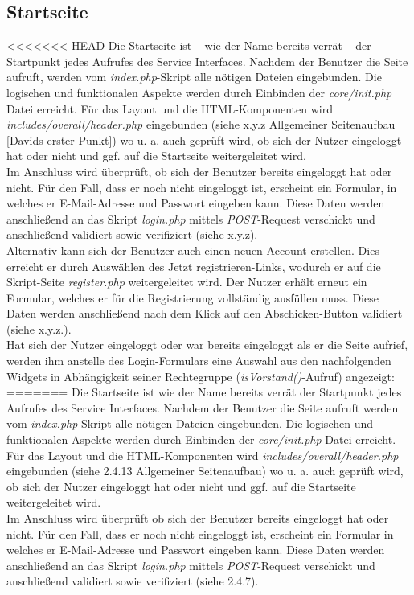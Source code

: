 \documentclass[fontsize = 12pt, paper = a4]{scrreprt}
\begin{document}
\subsection{Startseite}
<<<<<<< HEAD
Die Startseite ist -- wie der Name bereits verrät -- der Startpunkt jedes Aufrufes des Service Interfaces. Nachdem der Benutzer die Seite aufruft, werden vom \textit{index.php}-Skript alle nötigen Dateien eingebunden. Die logischen und funktionalen Aspekte werden durch Einbinden der \textit{core/init.php} Datei erreicht. Für das Layout und die HTML-Komponenten wird \textit{includes/overall/header.php} eingebunden (siehe x.y.z Allgemeiner Seitenaufbau [Davids erster Punkt]) wo u. a. auch geprüft wird, ob sich der Nutzer eingeloggt hat oder nicht und ggf. auf die Startseite weitergeleitet wird.\\
Im Anschluss wird überprüft, ob sich der Benutzer bereits eingeloggt hat oder nicht. Für den Fall, dass er noch nicht eingeloggt ist, erscheint ein Formular, in welches er E-Mail-Adresse und Passwort eingeben kann. Diese Daten werden anschließend an das Skript \textit{login.php} mittels \textit{POST}-Request verschickt und anschließend validiert sowie verifiziert (siehe x.y.z).\\
Alternativ kann sich der Benutzer auch einen neuen Account erstellen. Dies erreicht er durch Auswählen des \glqq Jetzt registrieren\grqq-Links, wodurch er auf die Skript-Seite \textit{register.php} weitergeleitet wird. Der Nutzer erhält erneut ein Formular, welches er für die Registrierung vollständig ausfüllen muss. Diese Daten werden anschließend nach dem Klick auf den Abschicken-Button validiert (siehe x.y.z.).\\
Hat sich der Nutzer eingeloggt oder war bereits eingeloggt als er die Seite aufrief, werden ihm anstelle des Login-Formulars eine Auswahl aus den nachfolgenden Widgets in Abhängigkeit seiner Rechtegruppe (\textit{isVorstand()}-Aufruf) angezeigt:
=======
Die Startseite ist wie der Name bereits verrät der Startpunkt jedes Aufrufes des Service Interfaces. Nachdem der Benutzer die Seite aufruft werden vom \textit{index.php}-Skript alle nötigen Dateien eingebunden. Die logischen und funktionalen Aspekte werden durch Einbinden der \textit{core/init.php} Datei erreicht. Für das Layout und die HTML-Komponenten wird \textit{includes/overall/header.php} eingebunden (siehe 2.4.13 Allgemeiner Seitenaufbau) wo u. a. auch geprüft wird, ob sich der Nutzer eingeloggt hat oder nicht und ggf. auf die Startseite weitergeleitet wird.\\
Im Anschluss wird überprüft ob sich der Benutzer bereits eingeloggt hat oder nicht. Für den Fall, dass er noch nicht eingeloggt ist, erscheint ein Formular in welches er E-Mail-Adresse und Passwort eingeben kann. Diese Daten werden anschließend an das Skript \textit{login.php} mittels \textit{POST}-Request verschickt und anschließend validiert sowie verifiziert (siehe 2.4.7).\\
\end{document}
